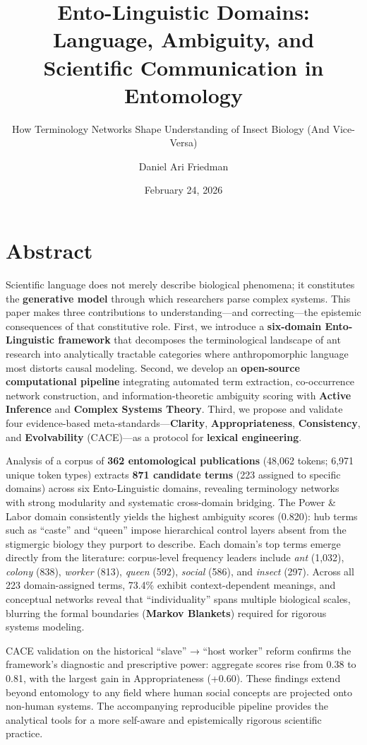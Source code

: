 \documentclass[
]{article}
\title{Ento-Linguistic Domains: Language, Ambiguity, and Scientific
Communication in Entomology}
\subtitle{How Terminology Networks Shape Understanding of Insect Biology
(And Vice-Versa)}
\author{Daniel Ari Friedman}
\date{February 24, 2026}
\numberwithin{equation}{section}
\begin{document}
\maketitle

{
\setcounter{tocdepth}{2}
\tableofcontents
}
\section{Abstract}\label{sec:abstract}

Scientific language does not merely describe biological phenomena; it
constitutes the \textbf{generative model} through which researchers
parse complex systems. This paper makes three contributions to
understanding---and correcting---the epistemic consequences of that
constitutive role. First, we introduce a \textbf{six-domain
Ento-Linguistic framework} that decomposes the terminological landscape
of ant research into analytically tractable categories where
anthropomorphic language most distorts causal modeling. Second, we
develop an \textbf{open-source computational pipeline} integrating
automated term extraction, co-occurrence network construction, and
information-theoretic ambiguity scoring with \textbf{Active Inference}
and \textbf{Complex Systems Theory}. Third, we propose and validate four
evidence-based meta-standards---\textbf{Clarity},
\textbf{Appropriateness}, \textbf{Consistency}, and
\textbf{Evolvability} (CACE)---as a protocol for \textbf{lexical
engineering}.

Analysis of a corpus of \textbf{362 entomological publications} (48,062
tokens; 6,971 unique token types) extracts \textbf{871 candidate terms}
(223 assigned to specific domains) across six Ento-Linguistic domains,
revealing terminology networks with strong modularity and systematic
cross-domain bridging. The Power \& Labor domain consistently yields the
highest ambiguity scores (0.820): hub terms such as ``caste'' and
``queen'' impose hierarchical control layers absent from the stigmergic
biology they purport to describe. Each domain's top terms emerge
directly from the literature: corpus-level frequency leaders include
\emph{ant} (1,032), \emph{colony} (838), \emph{worker} (813),
\emph{queen} (592), \emph{social} (586), and \emph{insect} (297). Across
all 223 domain-assigned terms, 73.4\% exhibit context-dependent
meanings, and conceptual networks reveal that ``individuality'' spans
multiple biological scales, blurring the formal boundaries
(\textbf{Markov Blankets}) required for rigorous systems modeling.

CACE validation on the historical ``slave'' → ``host worker'' reform
confirms the framework's diagnostic and prescriptive power: aggregate
scores rise from 0.38 to 0.81, with the largest gain in Appropriateness
(+0.60). These findings extend beyond entomology to any field where
human social concepts are projected onto non-human systems. The
accompanying reproducible pipeline provides the analytical tools for a
more self-aware and epistemically rigorous scientific practice.
\end{document}
